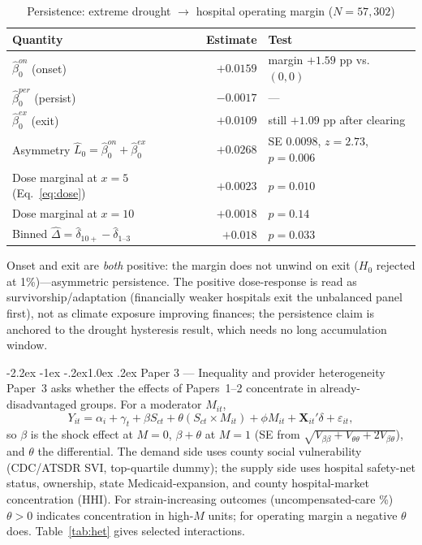 \documentclass[11pt]{article}
\makeatletter
\renewcommand\section{\@startsection{section}{1}{\z@}%
  {-2.2ex \@plus -1ex \@minus -.2ex}{1.0ex \@plus .2ex}%
  {\normalfont\large\bfseries}}
\newcommand{\Sct}{S_{ct}}
\makeatother
\begin{document}
\begin{table}[h]
\centering
\caption{Persistence: extreme drought $\to$ hospital operating margin ($N=57{,}302$)}
\label{tab:persist}
\small
\begin{tabular}{lrl}
\toprule
Quantity & Estimate & Test \\
\midrule
$\hat\beta^{on}_0$ (onset) & $+0.0159$ & margin $+1.59$ pp vs.\ $(0,0)$ \\
$\hat\beta^{per}_0$ (persist) & $-0.0017$ & --- \\
$\hat\beta^{ex}_0$ (exit) & $+0.0109$ & still $+1.09$ pp after clearing \\
Asymmetry $\hat L_0=\hat\beta^{on}_0+\hat\beta^{ex}_0$ & $+0.0268$ & SE $0.0098$, $z=2.73$, $p=0.006$ \\
Dose marginal at $x=5$ (Eq.\ \ref{eq:dose}) & $+0.0023$ & $p=0.010$ \\
Dose marginal at $x=10$ & $+0.0018$ & $p=0.14$ \\
Binned $\hat\Delta=\hat\delta_{10+}-\hat\delta_{1\text{--}3}$ & $+0.018$ & $p=0.033$ \\
\bottomrule
\end{tabular}

\vspace{2pt}
\footnotesize\raggedright
Onset and exit are \emph{both} positive: the margin does not unwind on exit
($H_0$ rejected at 1\%)---asymmetric persistence. The positive dose-response is read
as survivorship/adaptation (financially weaker hospitals exit the unbalanced panel
first), not as climate exposure improving finances; the persistence claim is
anchored to the drought hysteresis result, which needs no long accumulation window.
\end{table}

\section{Paper 3 --- Inequality and provider heterogeneity}
Paper~3 asks whether the effects of Papers~1--2 concentrate in already-disadvantaged
groups. For a moderator $M_{it}$,
\begin{equation}
Y_{it}=\alpha_i+\gamma_t+\beta \Sct+\theta(\Sct\times M_{it})+\phi M_{it}
        +\mathbf X_{it}'\delta+\varepsilon_{it},
\label{eq:het}
\end{equation}
so $\beta$ is the shock effect at $M=0$, $\beta+\theta$ at $M=1$ (SE from
$\sqrt{V_{\beta\beta}+V_{\theta\theta}+2V_{\beta\theta}}$), and $\theta$ the
differential. The demand side uses county social vulnerability (CDC/ATSDR SVI,
top-quartile dummy); the supply side uses hospital safety-net status, ownership,
state Medicaid-expansion, and county hospital-market concentration (HHI). For
strain-increasing outcomes (uncompensated-care \%) $\theta>0$ indicates concentration
in high-$M$ units; for operating margin a negative $\theta$ does.
Table~\ref{tab:het} gives selected interactions.
\end{document}
